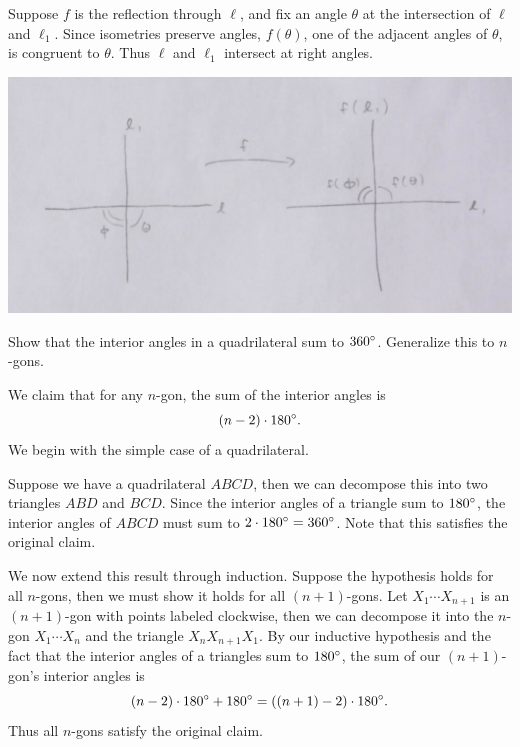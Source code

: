 \documentclass[twoside,10pt]{article}
\begin{document}
Suppose $f$ is the reflection through $\ell$, and fix an angle $\theta$ at the intersection of $\ell$ and $\ell_1$. Since isometries preserve angles, $f(\theta)$, one of the adjacent angles of $\theta$, is congruent to $\theta$. Thus $\ell$ and $\ell_1$ intersect at right angles.

\begin{center}
        \includegraphics[scale=0.7]{fig/3}
\end{center}

\newpage

\begin{exer}[1.22]
Show that the interior angles in a quadrilateral sum to $360^\circ$. Generalize this to $n$-gons.
\end{exer}

We claim that for any $n$-gon, the sum of the interior angles is
\[
	(n-2) \cdot 180^\circ.
\] We begin with the simple case of a quadrilateral.

Suppose we have a quadrilateral $ABCD$, then we can decompose this into two triangles $ABD$ and $BCD$. Since the interior angles of a triangle sum to $180^\circ$, the interior angles of $ABCD$ must sum to $2 \cdot 180^\circ = 360^\circ$. Note that this satisfies the original claim.

We now extend this result through induction. Suppose the hypothesis holds for all $n$-gons, then we must show it holds for all $(n+1)$-gons. Let $X_1\cdots X_{n+1}$ is an $(n+1)$-gon with points labeled clockwise, then we can decompose it into the $n$-gon $X_1\cdots X_{n}$ and the triangle $X_{n}X_{n+1}X_1$. By our inductive hypothesis and the fact that the interior angles of a triangles sum to $180^\circ$, the sum of our $(n+1)$-gon's interior angles is
\[
	(n-2) \cdot 180^\circ + 180^\circ = \left( (n+1)-2 \right) \cdot 180^\circ.
\] Thus all $n$-gons satisfy the original claim.
\end{document}
